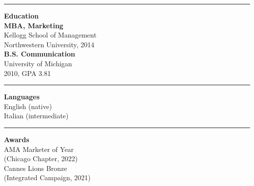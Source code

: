 \documentclass[11pt,a4paper]{article}
\begin{document}
\begin{minipage}[t]{0.34\textwidth}
\vspace{4pt}
\noindent\rule{\linewidth}{0.4pt}

\noindent\textbf{Education}\\[2pt]
\textbf{MBA, Marketing}\\
Kellogg School of Management\\
Northwestern University, 2014\\[4pt]
\textbf{B.S. Communication}\\
University of Michigan\\
2010, GPA 3.81

\vspace{4pt}
\noindent\rule{\linewidth}{0.4pt}

\noindent\textbf{Languages}\\
English (native)\\
Italian (intermediate)

\vspace{4pt}
\noindent\rule{\linewidth}{0.4pt}

\noindent\textbf{Awards}\\
AMA Marketer of Year\\
(Chicago Chapter, 2022)\\[2pt]
Cannes Lions Bronze\\
(Integrated Campaign, 2021)

\end{minipage}%
\hfill
\end{document}
